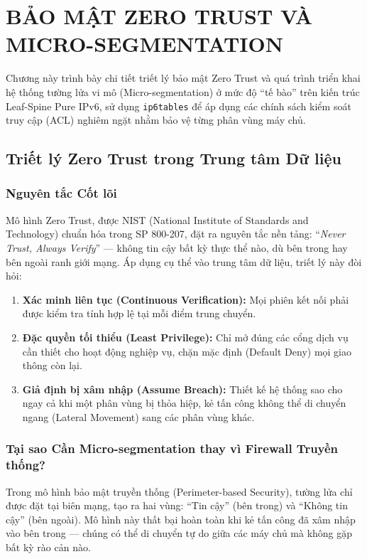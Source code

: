 \section{BẢO MẬT ZERO TRUST VÀ MICRO-SEGMENTATION}\label{sec:zero_trust}

Chương này trình bày chi tiết triết lý bảo mật Zero Trust và quá trình triển khai hệ thống tường lửa vi mô (Micro-segmentation) ở mức độ ``tế bào'' trên kiến trúc Leaf-Spine Pure IPv6, sử dụng \texttt{ip6tables} để áp dụng các chính sách kiểm soát truy cập (ACL) nghiêm ngặt nhằm bảo vệ từng phân vùng máy chủ.

\subsection{Triết lý Zero Trust trong Trung tâm Dữ liệu}

\subsubsection{Nguyên tắc Cốt lõi}

Mô hình Zero Trust, được NIST (National Institute of Standards and Technology) chuẩn hóa trong SP 800-207, đặt ra nguyên tắc nền tảng: ``\textit{Never Trust, Always Verify}'' — không tin cậy bất kỳ thực thể nào, dù bên trong hay bên ngoài ranh giới mạng. Áp dụng cụ thể vào trung tâm dữ liệu, triết lý này đòi hỏi:

\begin{enumerate}
    \item \textbf{Xác minh liên tục (Continuous Verification):} Mọi phiên kết nối phải được kiểm tra tính hợp lệ tại mỗi điểm trung chuyển.
    \item \textbf{Đặc quyền tối thiểu (Least Privilege):} Chỉ mở đúng các cổng dịch vụ cần thiết cho hoạt động nghiệp vụ, chặn mặc định (Default Deny) mọi giao thông còn lại.
    \item \textbf{Giả định bị xâm nhập (Assume Breach):} Thiết kế hệ thống sao cho ngay cả khi một phân vùng bị thỏa hiệp, kẻ tấn công không thể di chuyển ngang (Lateral Movement) sang các phân vùng khác.
\end{enumerate}

\subsubsection{Tại sao Cần Micro-segmentation thay vì Firewall Truyền thống?}

Trong mô hình bảo mật truyền thống (Perimeter-based Security), tường lửa chỉ được đặt tại biên mạng, tạo ra hai vùng: ``Tin cậy'' (bên trong) và ``Không tin cậy'' (bên ngoài). Mô hình này thất bại hoàn toàn khi kẻ tấn công đã xâm nhập vào bên trong — chúng có thể di chuyển tự do giữa các máy chủ mà không gặp bất kỳ rào cản nào.

